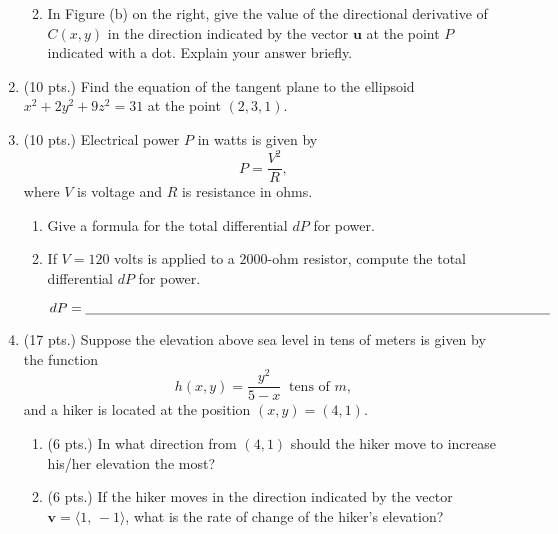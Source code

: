 \documentclass{report}
\begin{document}
\begin{enumerate}
\begin{enumerate}
\vskip 2.5cm

\item In Figure (b) on the right, give the value of the directional derivative
of $C(x,y)$ in the direction indicated by the vector $\mathbf u$ at the point $P$
indicated with a dot.  Explain your answer briefly.

\vskip 2.5cm


\end{enumerate}

\newpage

\item (10 pts.)
Find the equation of the tangent plane to the ellipsoid $x^2 + 2y^2 + 9z^2 = 31$ at the point
$(2,3,1)$.

\vskip 7cm


\item (10 pts.) Electrical power $P$ in watts is given by
$$
P = \frac{V^2}{R},
$$
where $V$ is voltage and $R$ is resistance in ohms.

\begin{enumerate}

\item Give a formula for the total differential $dP$ for power.

\vskip 3.5cm


\item If $V = 120$ volts is applied to a $2000$-ohm resistor, compute
the total differential $dP$ for power.  

\vfill

\hfill $dP = \underbar{\hskip 12cm}$

\end{enumerate}


\newpage

\item (17 pts.) Suppose the elevation above sea level in tens of meters 
is given by the function $$h(x,y) = \frac{y^2}{5-x} \ \text{  tens of } m,$$ and a hiker 
is located at the position $(x,y) = (4,1)$.  

\begin{enumerate}

\item (6 pts.) In what direction from $(4,1)$ should the hiker move to increase
his/her elevation the most?

\vskip 5cm

\item (6 pts.) If the hiker moves in the direction indicated by the vector
$\mathbf{v} = \langle 1, \, -1 \rangle$, what is the rate of change of the hiker's elevation?


\end{enumerate}
\end{enumerate}
\end{document}
